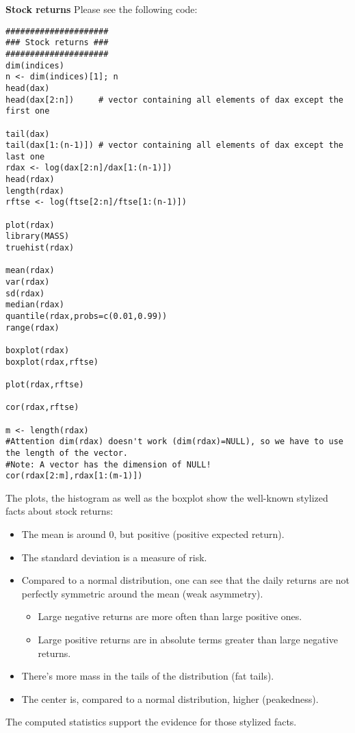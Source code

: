 \begin{Solution}{3.4}
\textbf{Stock returns}
Please see the following code:
\begin{verbatim}
#####################
### Stock returns ###
#####################
dim(indices)
n <- dim(indices)[1]; n
head(dax)
head(dax[2:n])     # vector containing all elements of dax except the first one

tail(dax)
tail(dax[1:(n-1)]) # vector containing all elements of dax except the last one
rdax <- log(dax[2:n]/dax[1:(n-1)])
head(rdax)
length(rdax)
rftse <- log(ftse[2:n]/ftse[1:(n-1)])

plot(rdax)
library(MASS)
truehist(rdax)

mean(rdax)
var(rdax)
sd(rdax)
median(rdax)
quantile(rdax,probs=c(0.01,0.99))
range(rdax)

boxplot(rdax)
boxplot(rdax,rftse)

plot(rdax,rftse)

cor(rdax,rftse)

m <- length(rdax)
#Attention dim(rdax) doesn't work (dim(rdax)=NULL), so we have to use the length of the vector.
#Note: A vector has the dimension of NULL!
cor(rdax[2:m],rdax[1:(m-1)])
\end{verbatim}

  The plots, the histogram as well as the boxplot show the well-known stylized facts about stock returns:
  \begin{itemize}
  \item The mean is around 0, but positive (positive expected return).
  \item The standard deviation is a measure of risk.
  \item Compared to a normal distribution, one can see that the daily returns are not perfectly symmetric around the mean (weak asymmetry).
  \begin{itemize}
  \item Large negative returns are more often than large positive ones.
  \item Large positive returns are in absolute terms greater than large negative returns.
  \end{itemize}
  \item There's more mass in the tails of the distribution (fat tails).
  \item The center is, compared to a normal distribution, higher (peakedness).
  \end{itemize}
  \item The computed statistics support the evidence for those stylized facts.
\end{Solution}
